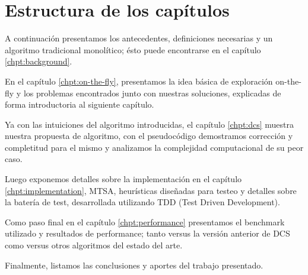 \section{Estructura de los capítulos}

A continuación presentamos los antecedentes, definiciones necesarias y un algoritmo tradicional monolítico; ésto puede encontrarse en el capítulo \ref{chpt:background}.

En el capítulo \ref{chpt:on-the-fly}, presentamos la idea básica de exploración on-the-fly y los problemas encontrados junto con nuestras soluciones, explicadas de forma introductoria al siguiente capítulo.

Ya con las intuiciones del algoritmo introducidas, el capítulo \ref{chpt:dcs} muestra nuestra propuesta de algoritmo, con el pseudocódigo demostramos corrección y completitud para el mismo y analizamos la complejidad computacional de su peor caso.

Luego exponemos detalles sobre la implementación en el capítulo \ref{chpt:implementation}, MTSA, heurísticas diseñadas para testeo y detalles sobre la batería de test, desarrollada utilizando TDD (Test Driven Development).

Como paso final en el capítulo \ref{chpt:performance} presentamos el benchmark utilizado y resultados de performance; tanto versus la versión anterior de DCS como versus otros algoritmos del estado del arte.

Finalmente, listamos las conclusiones y aportes del trabajo presentado.









